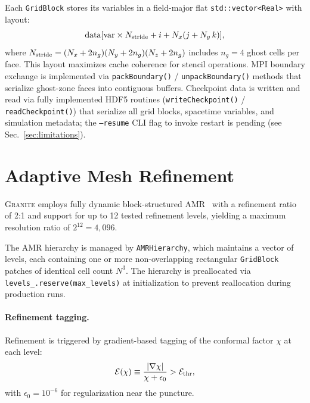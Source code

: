 \documentclass[aps,prd,twocolumn,superscriptaddress,nofootinbib,showpacs,
               longbibliography]{revtex4-2}
\newcommand{\granite}{\textsc{Granite}}
\newcommand{\code}[1]{\texttt{#1}}
\begin{document}
Each \code{GridBlock} stores its variables in a field-major flat
\code{std::vector<Real>} with layout:
\begin{equation}
  \text{data}[\text{var} \times N_{\rm stride}
    + i + N_x(j + N_y\,k)],
\end{equation}
where $N_{\rm stride} = (N_x + 2n_g)(N_y + 2n_g)(N_z + 2n_g)$
includes $n_g = 4$ ghost cells per face.
This layout maximizes cache coherence for stencil operations.
MPI boundary exchange is implemented via \code{packBoundary()} /
\code{unpackBoundary()} methods that serialize ghost-zone faces into
contiguous buffers.
Checkpoint data is written and read via fully implemented HDF5 routines
(\code{writeCheckpoint()} / \code{readCheckpoint()}) that serialize
all grid blocks, spacetime variables, and simulation metadata;
the \code{--resume} CLI flag to invoke restart is pending (see
Sec.~\ref{sec:limitations}).

\section{Adaptive Mesh Refinement}
\label{sec:amr}

\granite{} employs fully dynamic block-structured AMR~\cite{BergerOliger1984}
with a refinement ratio of 2:1 and support for up to 12 tested refinement
levels, yielding a maximum resolution ratio of $2^{12} = 4{,}096$.

The AMR hierarchy is managed by \code{AMRHierarchy}, which maintains a
vector of levels, each containing one or more non-overlapping rectangular
\code{GridBlock} patches of identical cell count $N^3$.
The hierarchy is preallocated via \code{levels\_.reserve(max\_levels)} at
initialization to prevent reallocation during production runs.

\paragraph{Refinement tagging.}
Refinement is triggered by gradient-based tagging of the conformal factor
$\chi$ at each level:
\begin{equation}
  \mathcal{E}(\chi) \equiv \frac{|\nabla\chi|}{\chi + \epsilon_0}
    > \mathcal{E}_{\rm thr},
\end{equation}
with $\epsilon_0 = 10^{-6}$ for regularization near the puncture.
\end{document}
